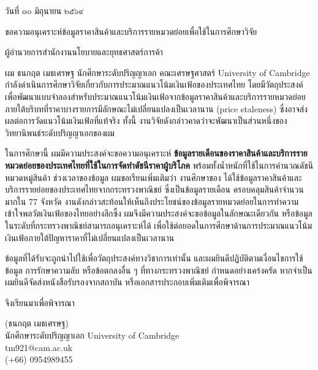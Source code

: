 \documentclass[a4paper,12pt]{article}
\newcommand{\fieldline}[2]{%
  \noindent\hangindent=1.55cm\hangafter=1%
  \makebox[1.55cm][l]{#1}#2\par
}
\begin{document}
	\fontsize{16pt}{20pt}\selectfont
	\setlength{\parindent}{1.27cm}
	\setlength{\parskip}{5pt}
	\sloppy

\begin{flushright}
วันที่ ๓๐ มิถุนายน ๒๕๖๙
\end{flushright}

\vspace{0.35cm}

\fieldline{เรื่อง}{ขอความอนุเคราะห์ข้อมูลราคาสินค้าและบริการรายหมวดย่อยเพื่อใช้ในการศึกษาวิจัย}
\fieldline{เรียน}{ผู้อำนวยการสำนักงานนโยบายและยุทธศาสตร์การค้า}
\fieldline{อ้างอิง}{}

\vspace{0.2cm}

ผม ธนกฤต เมธเศรษฐ นักศึกษาระดับปริญญาเอก คณะเศรษฐศาสตร์ University of Cambridge กำลังดำเนินการศึกษาวิจัยเกี่ยวกับการประมาณแนวโน้มเงินเฟ้อของประเทศไทย โดยมีวัตถุประสงค์เพื่อพัฒนาแบบจำลองสำหรับประมาณแนวโน้มเงินเฟ้อจากข้อมูลราคาสินค้าและบริการรายหมวดย่อย ภายใต้บริบทที่ราคาบางรายการมีลักษณะไม่เปลี่ยนแปลงเป็นเวลานาน (price staleness) ซึ่งอาจส่งผลต่อการวัดแนวโน้มเงินเฟ้อที่แท้จริง ทั้งนี้ งานวิจัยดังกล่าวคาดว่าจะพัฒนาเป็นส่วนหนึ่งของวิทยานิพนธ์ระดับปริญญาเอกของผม

ในการศึกษานี้ ผมมีความประสงค์จะขอความอนุเคราะห์ \textbf{ข้อมูลรายเดือนของราคาสินค้าและบริการรายหมวดย่อยของประเทศไทยที่ใช้ในการจัดทำดัชนีราคาผู้บริโภค} พร้อมทั้งน้ำหนักที่ใช้ในการคำนวณดัชนี หมวดหมู่สินค้า ช่วงเวลาของข้อมูล ผมขอเรียนเพิ่มเติมว่า งานศึกษาของ \textcite{APAITAN2020117} ได้ใช้ข้อมูลราคาสินค้าและบริการรายย่อยของประเทศไทยจากกระทรวงพาณิชย์ ซึ่งเป็นข้อมูลรายเดือน ครอบคลุมสินค้าจำนวนมากใน 77 จังหวัด งานดังกล่าวสะท้อนให้เห็นถึงประโยชน์ของข้อมูลรายหมวดย่อยในการทำความเข้าใจพลวัตเงินเฟ้อของไทยอย่างลึกซึ้ง ผมจึงมีความประสงค์จะขอข้อมูลในลักษณะเดียวกัน หรือข้อมูลในระดับที่กระทรวงพาณิชย์สามารถอนุเคราะห์ได้ เพื่อใช้ต่อยอดในการศึกษาด้านการประมาณแนวโน้มเงินเฟ้อภายใต้ปัญหาราคาที่ไม่เปลี่ยนแปลงเป็นเวลานาน

ข้อมูลที่ได้รับจะถูกนำไปใช้เพื่อวัตถุประสงค์ทางวิชาการเท่านั้น และผมยินดีปฏิบัติตามเงื่อนไขการใช้ข้อมูล การรักษาความลับ หรือข้อตกลงอื่น ๆ ที่ทางกระทรวงพาณิชย์ กำหนดอย่างเคร่งครัด หากจำเป็น ผมยินดีจัดส่งหนังสือรับรองจากสถาบัน หรือเอกสารประกอบเพิ่มเติมเพื่อพิจารณา

จึงเรียนมาเพื่อพิจารณา

\vspace{1.5cm}

\begin{flushright}
\begin{minipage}{9cm}
\centering
%

(ธนกฤต เมธเศรษฐ)\\
นักศึกษาระดับปริญญาเอก University of Cambridge\\
tm921@cam.ac.uk\\
(+66) 0954989455
\end{minipage}
\end{flushright}
\end{document}
